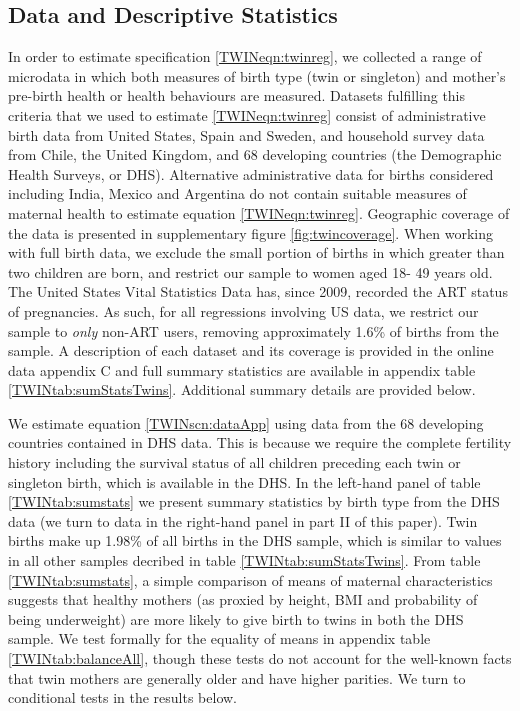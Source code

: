 \documentclass[subeqn]{article}
\begin{document}
\begin{spacing}{1.4}
\section{Data and Descriptive Statistics}              \label{TWINscn:data}
In order to estimate specification \ref{TWINeqn:twinreg}, we collected a range
of microdata in which both measures of birth type (twin or singleton) and
mother's pre-birth health or health behaviours are measured.  Datasets
fulfilling this criteria that we used to estimate \ref{TWINeqn:twinreg} consist
of administrative birth data from United States, Spain and Sweden, and household
survey data from Chile, the United Kingdom, and 68 developing countries (the
Demographic Health Surveys, or DHS).  Alternative administrative data for
births considered including India, Mexico and Argentina do not contain suitable
measures of maternal health to estimate equation \ref{TWINeqn:twinreg}.
Geographic coverage of the data is presented in supplementary figure
\ref{fig:twincoverage}. When
working with full birth data, we exclude the small portion of births in which
greater than two children are born, and restrict our sample to women aged 18-%
49 years old. The United States Vital Statistics Data has, since 2009,
recorded the ART status of pregnancies.  As such, for all regressions
involving US data, we restrict our sample to \emph{only} non-ART users, removing
approximately 1.6\% of births from the sample.  A description of each dataset
and its coverage is provided in the online data appendix C and full summary
statistics are available in appendix table \ref{TWINtab:sumStatsTwins}.
Additional summary details are provided below.

We estimate equation \ref{TWINscn:dataApp} using data from the 68 developing
countries contained in DHS data.  This is because we require the complete
fertility history including the survival status of all children preceding each
twin or singleton birth, which is available in the DHS.  In the left-hand panel
of table \ref{TWINtab:sumstats} we present summary statistics by birth type
from the DHS data (we turn to data in the right-hand panel in part II of this
paper). Twin births make up 1.98\% of all births
in the DHS sample, which is similar to values in all other samples decribed in
table \ref{TWINtab:sumStatsTwins}. From table \ref{TWINtab:sumstats}, a
simple comparison of means of maternal characteristics suggests that healthy
mothers (as proxied by height, BMI and probability of being underweight) are
more likely to give birth to twins in both the DHS sample. We test formally for
the equality of means in appendix table \ref{TWINtab:balanceAll}, though these
tests do not account for the well-known facts that twin mothers are generally
older and have higher parities.  We turn to conditional tests in the results
below.


\end{spacing}
\end{document}
